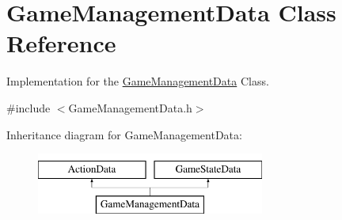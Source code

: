 \hypertarget{classGameManagementData}{\section{Game\-Management\-Data Class Reference}
\label{classGameManagementData}
}


Implementation for the \hyperlink{classGameManagementData}{Game\-Management\-Data} Class.  




{\ttfamily \#include $<$Game\-Management\-Data.\-h$>$}

Inheritance diagram for Game\-Management\-Data\-:\begin{figure}[H]
\begin{center}
\leavevmode
\includegraphics[height=2.000000cm]{classGameManagementData}
\end{center}
\end{figure}
